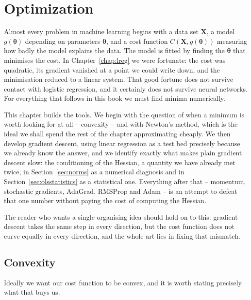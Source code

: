 \chapter{Optimization}
\label{chap:optim}

Almost every problem in machine learning begins with a data set $\bm{X}$, a
model $g(\bm{\theta})$ depending on parameters $\bm{\theta}$, and a cost
function $C(\bm{X},g(\bm{\theta}))$ measuring how badly the model explains the
data.  The model is fitted by finding the $\bm{\theta}$ that minimises the
cost.  In Chapter~\ref{chap:lreg} we were fortunate: the cost was quadratic,
its gradient vanished at a point we could write down, and the minimisation
reduced to a linear system.  That good fortune does not survive contact with
logistic regression, and it certainly does not survive neural networks.  For
everything that follows in this book we must find minima numerically.

This chapter builds the tools.  We begin with the question of when a minimum
is worth looking for at all -- convexity -- and with Newton's method, which is
the ideal we shall spend the rest of the chapter approximating cheaply.  We
then develop gradient descent, using linear regression as a test bed precisely
because we already know the answer, and we identify exactly what makes plain
gradient descent slow: the conditioning of the Hessian, a quantity we have
already met twice, in Section~\ref{sec:norms} as a numerical diagnosis and in
Section~\ref{sec:olsstatistics} as a statistical one.  Everything after that --
momentum, stochastic gradients, AdaGrad, RMSProp and Adam -- is an attempt to
defeat that one number without paying the cost of computing the Hessian.

The reader who wants a single organising idea should hold on to this: gradient
descent takes the same step in every direction, but the cost function does not
curve equally in every direction, and the whole art lies in fixing that
mismatch.

\section{Convexity}
\label{sec:convexity}

Ideally we want our cost function to be convex, and it is worth stating
precisely what that buys us.

